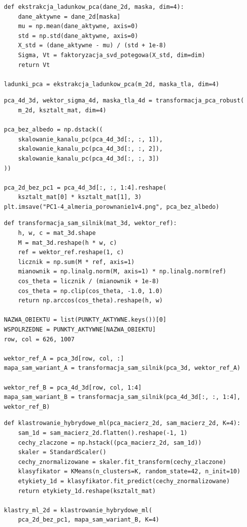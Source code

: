 \documentclass[12pt,a4paper]{article}
\begin{document}
\begin{lstlisting}[caption={Obliczenie ładunków PCA.},label={lst:loadings}]
def ekstrakcja_ladunkow_pca(dane_2d, maska, dim=4):
    dane_aktywne = dane_2d[maska]
    mu = np.mean(dane_aktywne, axis=0)
    std = np.std(dane_aktywne, axis=0)
    X_std = (dane_aktywne - mu) / (std + 1e-8)
    Sigma, Vt = faktoryzacja_svd_potegowa(X_std, dim=dim)
    return Vt

ladunki_pca = ekstrakcja_ladunkow_pca(m_2d, maska_tla, dim=4)
\end{lstlisting}

\begin{lstlisting}[caption={Użycie składowych PCA bez PC1.},label={lst:pca-without-pc1}]
pca_4d_3d, wektor_sigma_4d, maska_tla_4d = transformacja_pca_robust(
    m_2d, ksztalt_mat, dim=4)

pca_bez_albedo = np.dstack((
    skalowanie_kanalu_pc(pca_4d_3d[:, :, 1]),
    skalowanie_kanalu_pc(pca_4d_3d[:, :, 2]),
    skalowanie_kanalu_pc(pca_4d_3d[:, :, 3])
))

pca_2d_bez_pc1 = pca_4d_3d[:, :, 1:4].reshape(
    ksztalt_mat[0] * ksztalt_mat[1], 3)
plt.imsave("PC1-4_almeria_porownanie1v4.png", pca_bez_albedo)
\end{lstlisting}

\begin{lstlisting}[caption={Obliczenie mapy SAM.},label={lst:sam}]
def transformacja_sam_silnik(mat_3d, wektor_ref):
    h, w, c = mat_3d.shape
    M = mat_3d.reshape(h * w, c)
    ref = wektor_ref.reshape(1, c)
    licznik = np.sum(M * ref, axis=1)
    mianownik = np.linalg.norm(M, axis=1) * np.linalg.norm(ref)
    cos_theta = licznik / (mianownik + 1e-8)
    cos_theta = np.clip(cos_theta, -1.0, 1.0)
    return np.arccos(cos_theta).reshape(h, w)

NAZWA_OBIEKTU = list(PUNKTY_AKTYWNE.keys())[0]
WSPOLRZEDNE = PUNKTY_AKTYWNE[NAZWA_OBIEKTU]
row, col = 626, 1007

wektor_ref_A = pca_3d[row, col, :]
mapa_sam_wariant_A = transformacja_sam_silnik(pca_3d, wektor_ref_A)

wektor_ref_B = pca_4d_3d[row, col, 1:4]
mapa_sam_wariant_B = transformacja_sam_silnik(pca_4d_3d[:, :, 1:4], wektor_ref_B)
\end{lstlisting}

\begin{lstlisting}[caption={Segmentacja K-Means na cechach PCA i SAM bez PC1.},label={lst:kmeans-hybrid}]
def klastrowanie_hybrydowe_ml(pca_macierz_2d, sam_macierz_2d, K=4):
    sam_1d = sam_macierz_2d.flatten().reshape(-1, 1)
    cechy_zlaczone = np.hstack((pca_macierz_2d, sam_1d))
    skaler = StandardScaler()
    cechy_znormalizowane = skaler.fit_transform(cechy_zlaczone)
    klasyfikator = KMeans(n_clusters=K, random_state=42, n_init=10)
    etykiety_1d = klasyfikator.fit_predict(cechy_znormalizowane)
    return etykiety_1d.reshape(ksztalt_mat)

klastry_ml_2d = klastrowanie_hybrydowe_ml(
    pca_2d_bez_pc1, mapa_sam_wariant_B, K=4)
\end{lstlisting}
\end{document}
